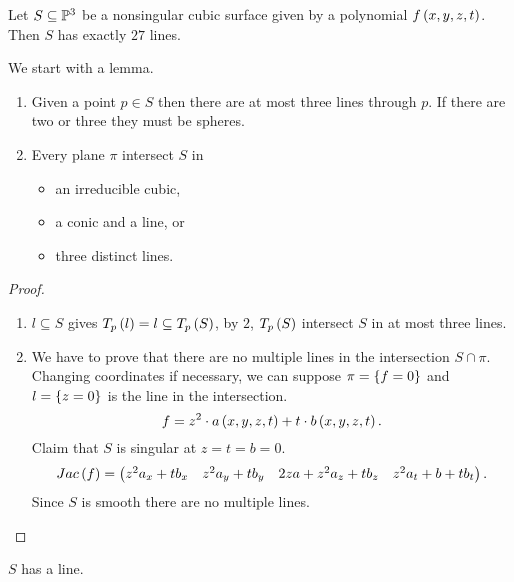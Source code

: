 
\begin{theorem}
Let $ S \subseteq \P^3 $ be a nonsingular cubic surface given by a polynomial $ f\rb{x, y, z, t} $. Then $ S $ has exactly $ 27 $ lines.
\end{theorem}

We start with a lemma.

\begin{lemma}
\hfill
\begin{enumerate}
\item Given a point $ p \in S $ then there are at most three lines through $ p $. If there are two or three they must be spheres.
\item Every plane $ \pi $ intersect $ S $ in
\begin{itemize}
\item an irreducible cubic,
\item a conic and a line, or
\item three distinct lines.
\end{itemize}
\end{enumerate}
\end{lemma}

\begin{proof}
\hfill
\begin{enumerate}
\item $ l \subseteq S $ gives $ T_p\rb{l} = l \subseteq T_p\rb{S} $, by $ 2 $, $ T_p\rb{S} $ intersect $ S $ in at most three lines.
\item We have to prove that there are no multiple lines in the intersection $ S \cap \pi $. Changing coordinates if necessary, we can suppose $ \pi = \cb{f = 0} $ and $ l = \cb{z = 0} $ is the line in the intersection.
$$ f = z^2 \cdot a\rb{x, y, z, t} + t \cdot b\rb{x, y, z, t}. $$
Claim that $ S $ is singular at $ z = t = b = 0 $.
$$ Jac\rb{f} = \onebytwo{z^2a_x + tb_x & z^2a_y + tb_y}{2za + z^2a_z + tb_z & z^2a_t + b + tb_t}. $$
Since $ S $ is smooth there are no multiple lines.
\end{enumerate}
\end{proof}

\begin{lemma}
$ S $ has a line.
\end{lemma}

